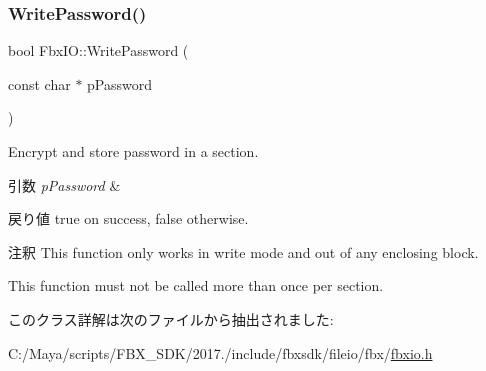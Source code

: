 \subsubsection{\texorpdfstring{Write\+Password()}{WritePassword()}}
{\footnotesize\ttfamily bool Fbx\+I\+O\+::\+Write\+Password (\begin{DoxyParamCaption}\item[{const char $\ast$}]{p\+Password }\end{DoxyParamCaption})}

Encrypt and store password in a section. 
\begin{DoxyParams}{引数}
{\em p\+Password} & \\
\hline
\end{DoxyParams}
\begin{DoxyReturn}{戻り値}
{\ttfamily true} on success, {\ttfamily false} otherwise. 
\end{DoxyReturn}
\begin{DoxyRemark}{注釈}
This function only works in write mode and out of any enclosing block. 

This function must not be called more than once per section. 
\end{DoxyRemark}


このクラス詳解は次のファイルから抽出されました\+:\begin{DoxyCompactItemize}
\item 
C\+:/\+Maya/scripts/\+F\+B\+X\+\_\+\+S\+D\+K/2017./include/fbxsdk/fileio/fbx/\hyperlink{fbxio_8h}{fbxio.\+h}\end{DoxyCompactItemize}
